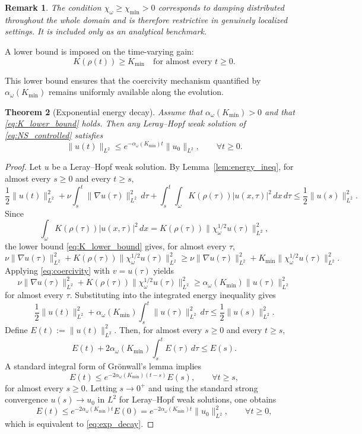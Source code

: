 \documentclass[preprint,12pt]{elsarticle}
\newtheorem{theorem} {Theorem}[section]
\newtheorem{remark}[theorem]{Remark}
\begin{document}
\begin{remark}
The condition $\chi_\omega\ge \chi_{\min}>0$ corresponds to damping distributed
throughout the whole domain and is therefore restrictive in genuinely localized
settings.
It is included only as an analytical benchmark.
\end{remark}

A lower bound is imposed on the time-varying gain:
\begin{equation}
\label{eq:K_lower_bound}
K(\rho(t)) \ge K_{\min}
\quad \text{for almost every } t\ge 0.
\end{equation}

This lower bound ensures that the coercivity mechanism quantified by
$\alpha_\omega(K_{\min})$ remains uniformly available along the evolution.

\begin{theorem}[Exponential energy decay]
\label{thm:exp_decay}
Assume that $\alpha_\omega(K_{\min})>0$ and that
\eqref{eq:K_lower_bound} holds.
Then any Leray--Hopf weak solution of \eqref{eq:NS_controlled} satisfies
\begin{equation}
\label{eq:exp_decay}
\|u(t)\|_{L^2} \le e^{-\alpha_\omega(K_{\min}) t}\|u_0\|_{L^2},
\qquad \forall t\ge 0.
\end{equation}
\end{theorem}

\begin{proof}
Let $u$ be a Leray--Hopf weak solution.
By Lemma~\ref{lem:energy_ineq}, for almost every $s\ge0$ and every $t\ge s$,
\[
\frac12\|u(t)\|_{L^2}^2
+\nu\int_s^t\|\nabla u(\tau)\|_{L^2}^2\,d\tau
+\int_s^t\int_\omega K(\rho(\tau))|u(x,\tau)|^2\,dx\,d\tau
\le
\frac12\|u(s)\|_{L^2}^2.
\]
Since
\[
\int_\omega K(\rho(\tau))|u(x,\tau)|^2\,dx
=
K(\rho(\tau))\|\chi_\omega^{1/2}u(\tau)\|_{L^2}^2,
\]
the lower bound \eqref{eq:K_lower_bound} gives, for almost every $\tau$,
\[
\nu\|\nabla u(\tau)\|_{L^2}^2
+K(\rho(\tau))\|\chi_\omega^{1/2}u(\tau)\|_{L^2}^2
\ge
\nu\|\nabla u(\tau)\|_{L^2}^2
+K_{\min}\|\chi_\omega^{1/2}u(\tau)\|_{L^2}^2.
\]
Applying \eqref{eq:coercivity} with $v=u(\tau)$ yields
\[
\nu\|\nabla u(\tau)\|_{L^2}^2
+K(\rho(\tau))\|\chi_\omega^{1/2}u(\tau)\|_{L^2}^2
\ge
\alpha_\omega(K_{\min})\|u(\tau)\|_{L^2}^2
\]
for almost every $\tau$.
Substituting into the integrated energy inequality gives
\[
\frac12\|u(t)\|_{L^2}^2
+\alpha_\omega(K_{\min})\int_s^t \|u(\tau)\|_{L^2}^2\,d\tau
\le
\frac12\|u(s)\|_{L^2}^2.
\]
Define $E(t):=\|u(t)\|_{L^2}^2$.
Then, for almost every $s\ge0$ and every $t\ge s$,
\[
E(t)+2\alpha_\omega(K_{\min})\int_s^t E(\tau)\,d\tau \le E(s).
\]
A standard integral form of Gr\"onwall's lemma implies
\[
E(t)\le e^{-2\alpha_\omega(K_{\min})(t-s)}E(s),
\qquad \forall t\ge s,
\]
for almost every $s\ge0$.
Letting $s\to0^+$ and using the standard strong convergence
$u(s)\to u_0$ in $L^2$ for Leray--Hopf weak solutions, one obtains
\[
E(t)\le e^{-2\alpha_\omega(K_{\min})t}E(0)
=
e^{-2\alpha_\omega(K_{\min})t}\|u_0\|_{L^2}^2,
\qquad \forall t\ge0,
\]
which is equivalent to \eqref{eq:exp_decay}.
\end{proof}
\end{document}
